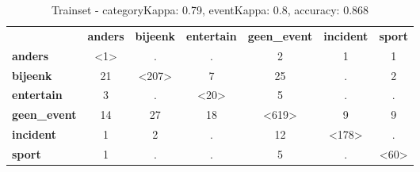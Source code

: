 {{\begin{table}[H]
\centering
\caption{Trainset - categoryKappa: 0.79, eventKappa: 0.8, accuracy: 0.868}\label{annotationtrain}
\vspace*{-5pt}
\begin{tabular}{lcccccc}
& \multicolumn{1}{l}{\textbf{anders}} & \multicolumn{1}{l}{\textbf{bijeenk}} & \multicolumn{1}{l}{\textbf{entertain}} & \multicolumn{1}{l}{\textbf{geen\_event}} & \multicolumn{1}{l}{\textbf{incident}} & \multicolumn{1}{l}{\textbf{sport}} \\ \cline{2-7} 
\multicolumn{1}{l|}{\textbf{anders}} & \multicolumn{1}{c|}{\textless1\textgreater} & \multicolumn{1}{c|}{.} & \multicolumn{1}{c|}{.} & \multicolumn{1}{c|}{2} & \multicolumn{1}{c|}{1} & \multicolumn{1}{c|}{1} \\ \cline{2-7} 
\multicolumn{1}{l|}{\textbf{bijeenk}} & \multicolumn{1}{c|}{21} & \multicolumn{1}{c|}{\textless207\textgreater} & \multicolumn{1}{c|}{7} & \multicolumn{1}{c|}{25} & \multicolumn{1}{c|}{.} & \multicolumn{1}{c|}{2} \\ \cline{2-7} 
\multicolumn{1}{l|}{\textbf{entertain}} & \multicolumn{1}{c|}{3} & \multicolumn{1}{c|}{.} & \multicolumn{1}{c|}{\textless20\textgreater} & \multicolumn{1}{c|}{5} & \multicolumn{1}{c|}{.} & \multicolumn{1}{c|}{.} \\ \cline{2-7} 
\multicolumn{1}{l|}{\textbf{geen\_event}} & \multicolumn{1}{c|}{14} & \multicolumn{1}{c|}{27} & \multicolumn{1}{c|}{18} & \multicolumn{1}{c|}{\textless619\textgreater} & \multicolumn{1}{c|}{9} & \multicolumn{1}{c|}{9} \\ \cline{2-7} 
\multicolumn{1}{l|}{\textbf{incident}} & \multicolumn{1}{c|}{1} & \multicolumn{1}{c|}{2} & \multicolumn{1}{c|}{.} & \multicolumn{1}{c|}{12} & \multicolumn{1}{c|}{\textless178\textgreater} & \multicolumn{1}{c|}{.} \\ \cline{2-7} 
\multicolumn{1}{l|}{\textbf{sport}} & \multicolumn{1}{c|}{1} & \multicolumn{1}{c|}{.} & \multicolumn{1}{c|}{.} & \multicolumn{1}{c|}{5} & \multicolumn{1}{c|}{.} & \multicolumn{1}{c|}{\textless60\textgreater} \\ \cline{2-7} 
\end{tabular}
\end{table}

}}
